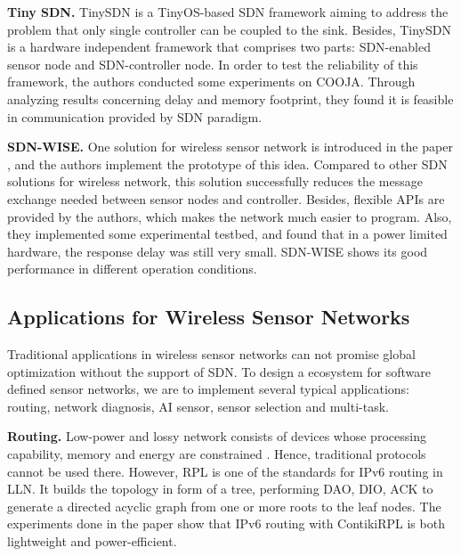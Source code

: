 \textbf{Tiny SDN.}
TinySDN \cite{de2015tinysdn} is a TinyOS-based SDN framework aiming to 
address the problem that only single controller can be coupled to the sink. 
Besides, TinySDN is a hardware independent framework that comprises two parts: 
SDN-enabled sensor node and SDN-controller node. 
In order to test the reliability of this framework, the authors conducted some experiments on COOJA. 
Through analyzing results concerning delay and memory 
footprint, they found it is feasible in communication provided by SDN paradigm.

\textbf{SDN-WISE.}
One solution for wireless sensor network is introduced in the paper \cite{galluccio2015sdn}, 
and the authors implement the prototype of this idea. Compared to other SDN solutions for wireless network, 
this solution successfully reduces the message exchange needed between sensor nodes and controller. 
Besides, flexible APIs are provided by the authors, which makes the network much easier to program. 
Also, they implemented some experimental testbed, and found that in a power limited hardware, the response delay was still very small. 
SDN-WISE shows its good performance in different operation conditions.


\subsection{Applications for Wireless Sensor Networks}
Traditional applications in wireless sensor networks 
can not promise global optimization without the support of SDN.
To design a ecosystem for software defined sensor networks, 
we are to implement several typical applications:
routing, network diagnosis, AI sensor, sensor selection and multi-task.


\textbf{Routing.}
Low-power and lossy network consists of devices whose processing capability, 
memory and energy are constrained \cite{Winter2012}. Hence, traditional 
protocols cannot be used there. However, RPL is one of the standards for IPv6\cite{Deering1998Internet} routing in LLN. 
It builds the topology in form of a tree, performing DAO, DIO, ACK to generate a directed acyclic graph 
from one or more roots to the leaf nodes. The experiments done in the paper \cite{Tsiftes2010a} show 
that IPv6 routing with ContikiRPL is both lightweight and power-efficient.
 
